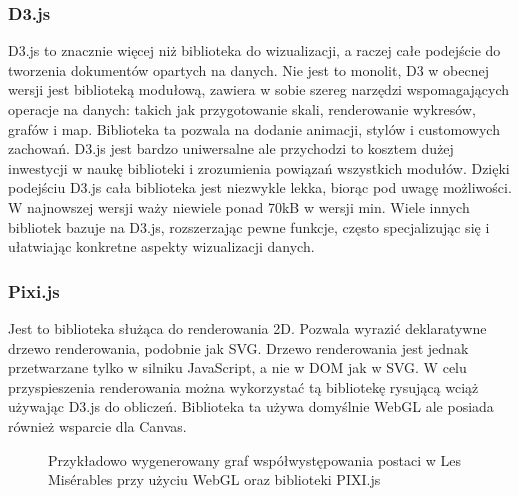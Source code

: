 \documentclass[12pt,a4paper]{article} %
\begin{document}
    \subsubsection{D3.js}
        D3.js to znacznie więcej niż biblioteka do wizualizacji, a raczej całe podejście do tworzenia dokumentów opartych na danych. Nie jest to monolit, D3 w obecnej wersji jest biblioteką modułową, zawiera w sobie szereg narzędzi wspomagających operacje na danych: takich jak przygotowanie skali, renderowanie wykresów, grafów i map. Biblioteka ta pozwala na dodanie animacji, stylów i customowych zachowań.
        D3.js jest bardzo uniwersalne ale przychodzi to kosztem dużej inwestycji w naukę biblioteki i zrozumienia powiązań wszystkich modułów. Dzięki podejściu D3.js cała biblioteka jest niezwykle lekka, biorąc pod uwagę możliwości. W najnowszej wersji waży niewiele ponad 70kB w wersji min. Wiele innych bibliotek bazuje na D3.js, rozszerzając pewne funkcje, często specjalizując się i ułatwiając konkretne aspekty wizualizacji danych. 
    
    \subsubsection{Pixi.js}
        Jest to biblioteka służąca do renderowania 2D. Pozwala wyrazić deklaratywne drzewo renderowania, podobnie jak SVG. Drzewo renderowania jest jednak przetwarzane tylko w silniku JavaScript, a nie w DOM jak w SVG. W celu przyspieszenia renderowania można wykorzystać tą bibliotekę rysującą wciąż używając D3.js do obliczeń. Biblioteka ta używa domyślnie WebGL ale posiada również wsparcie dla Canvas. 


\begin{figure}[h]
\caption{Przykładowo wygenerowany graf współwystępowania postaci w Les Misérables przy użyciu WebGL oraz biblioteki PIXI.js}
\label{fig:hotfixToBeChangedLater}%
\centering
\end{figure}
\end{document}
